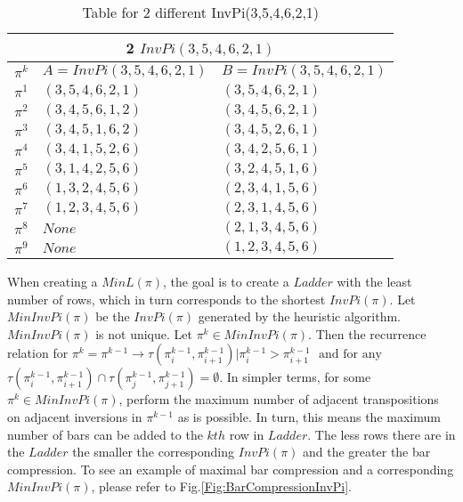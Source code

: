 \begin{table}[!htp]
    \begin{tabular}{|p{3cm}|p{5cm}|p{5cm}|}
        \hline 
    \multicolumn{3}{|c|}{2 $InvPi(3,5,4,6,2,1)$}\\
    \hline 
    \hline 
    $\pi^{k}$ & $A=InvPi(3,5,4,6,2,1)$ & $B=InvPi(3,5,4,6,2,1)$\\ 
    \hline 
    $\pi^{1}$ & $(3,5,4,6,2,1)$ & $(3,5,4,6,2,1)$\\ 
    \hline
    $\pi^{2}$ & $(3,4,5,6,1,2)$ & $(3,4,5,6,2,1)$\\ 
    \hline 
    $\pi^{3}$ & $(3,4,5,1,6,2)$ & $(3,4,5,2,6,1)$ \\ 
    \hline 
    $\pi^{4}$ & $(3,4,1,5,2,6)$ & $(3,4,2,5,6,1)$ \\ 
    \hline 
    $\pi^{5}$ & $(3,1,4,2,5,6)$ & $(3,2,4,5,1,6)$\\ 
    \hline 
    $\pi^{6}$ & $(1,3,2,4,5,6)$ & $(2,3,4,1,5,6)$\\ 
    \hline 
    $\pi^{7}$ & $(1,2,3,4,5,6)$ & $(2,3,1,4,5,6)$\\ 
    \hline 
    $\pi^{8}$ & $None$  & $(2,1,3,4,5,6)$ \\ 
    \hline 
     $\pi^{9}$ & $None$  & $(1,2,3,4,5,6)$ \\ 
    \hline 

        
    \end{tabular}
    \caption{Table for 2 different InvPi(3,5,4,6,2,1)}
    \label{Tab:InvPi}
\end{table}



When creating a $MinL(\pi)$, the goal is to create a $Ladder$ with the least number of rows, which in turn corresponds 
to the shortest $InvPi(\pi)$.
Let $MinInvPi(\pi)$ be the $InvPi(\pi)$ generated by the heuristic algorithm. $MinInvPi(\pi)$ is not unique.
Let $\pi^{k} \in MinInvPi(\pi)$. Then the recurrence relation for $\pi^{k}=\pi^{k-1} \rightarrow \tau(\pi^{k-1}_{i},\pi^{k-1}_{i+1}) | \pi^{k-1}_{i}>\pi^{k-1}_{i+1}$ $\mbox{ and for any }$$\tau(\pi^{k-1}_{i},\pi^{k-1}_{i+1}) \cap \tau(\pi^{k-1}_{j},\pi^{k-1}_{j+1}) = \emptyset$. 
In simpler terms, for some $\pi^{k} \in MinInvPi(\pi)$, perform the maximum number 
of adjacent transpositions on adjacent inversions in $\pi^{k-1}$ as is possible.
In turn, this means the maximum number of bars can be added to the $kth$ row in $Ladder$.
The less rows there are in the $Ladder$ the smaller the corresponding 
 $InvPi(\pi)$ and the greater the bar compression.
 To see an example of maximal bar compression and a corresponding $MinInvPi(\pi)$, please refer to Fig.\ref{Fig:BarCompressionInvPi}.

